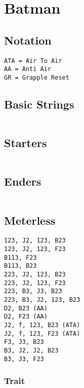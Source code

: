 \documentclass[main.tex]{subfiles}
\begin{document}
\chapter{Batman}

\section{Notation}
\begin{lstlisting}[language=FG]
ATA = Air To Air
AA = Anti Air
GR = Grapple Reset
\end{lstlisting}


\section{Basic Strings}

\begin{lstlisting}[language=FG]
\end{lstlisting}

\section{Starters}
\begin{lstlisting}[language=FG]

\end{lstlisting}

\section{Enders}

\begin{lstlisting}[language=FG]
\end{lstlisting}

\section{Meterless}

\begin{lstlisting}[language=FG]
123, J2, 123, B23
123, J2, 123, F23
B113, F23
B113, B23
223, J2, 123, B23
223, J2, 123, F23
223, B3, J3, B23
223, B3, J2, 123, B23
D2, B23 (AA)
D2, F23 (AA)
J2, f, 123, B23 (ATA)
J2, f, 123, F23 (ATA)
F3, J3, B23
B3, J2, J2, B23
B3, J3, F23
\end{lstlisting}

\subsection{Trait}
\end{document}
